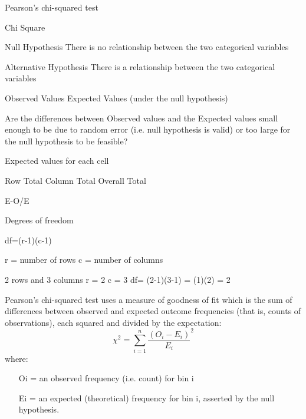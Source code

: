 Pearson's chi-squared test

Chi Square

Null Hypothesis
There is no relationship between the two categorical variables

Alternative Hypothesis
There is a relationship between the two categorical variables


Observed Values
Expected Values (under the null hypothesis)

Are the differences between Observed values and the Expected values
small enough to be due to random error (i.e. null hypothesis is valid)
or too large for the null hypothesis to be feasible?

Expected values for each cell

Row Total Column Total
Overall Total

E-O/E



Degrees of freedom

df=(r-1)(c-1)

r = number of rows
c = number of columns

2 rows and 3 columns r = 2 c = 3 
df= (2-1)(3-1) = (1)(2) = 2



Pearson's chi-squared test uses a measure of goodness of fit which is the sum of differences between observed and expected outcome frequencies (that is, counts of observations), each squared and divided by the expectation:
\[ \chi^2 = \sum_{i=1}^n {\frac{(O_i - E_i)}{E_i}^2} \]
where:

\begin{itemize}
\item[Oi] = an observed frequency (i.e. count) for bin i
\item[Ei] = an expected (theoretical) frequency for bin i, asserted by the null hypothesis.
\end{itemize}
